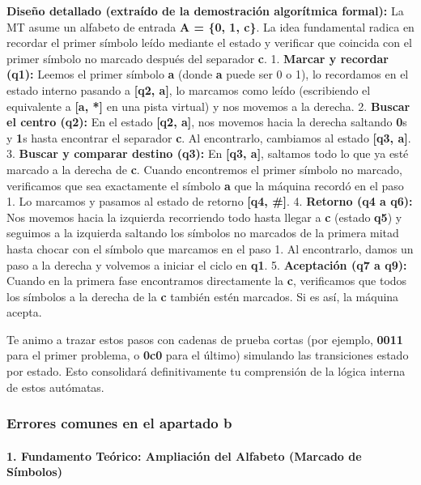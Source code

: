 \documentclass[12pt]{book} %
\begin{document}
\textbf{Diseño detallado (extraído de la demostración algorítmica
formal):} La MT asume un alfabeto de entrada \textbf{A = \{0, 1, c\}}.
La idea fundamental radica en recordar el primer símbolo leído mediante
el estado y verificar que coincida con el primer símbolo no marcado
después del separador \textbf{c}. 1. \textbf{Marcar y recordar (q1):}
Leemos el primer símbolo \textbf{a} (donde \textbf{a} puede ser 0 o 1),
lo recordamos en el estado interno pasando a \textbf{{[}q2, a{]}}, lo
marcamos como leído (escribiendo el equivalente a \textbf{{[}a, *{]}} en
una pista virtual) y nos movemos a la derecha. 2. \textbf{Buscar el
centro (q2):} En el estado \textbf{{[}q2, a{]}}, nos movemos hacia la
derecha saltando \textbf{0}s y \textbf{1}s hasta encontrar el separador
\textbf{c}. Al encontrarlo, cambiamos al estado \textbf{{[}q3, a{]}}. 3.
\textbf{Buscar y comparar destino (q3):} En \textbf{{[}q3, a{]}},
saltamos todo lo que ya esté marcado a la derecha de \textbf{c}. Cuando
encontremos el primer símbolo no marcado, verificamos que sea
exactamente el símbolo \textbf{a} que la máquina recordó en el paso 1.
Lo marcamos y pasamos al estado de retorno \textbf{{[}q4, \#{]}}. 4.
\textbf{Retorno (q4 a q6):} Nos movemos hacia la izquierda recorriendo
todo hasta llegar a \textbf{c} (estado \textbf{q5}) y seguimos a la
izquierda saltando los símbolos no marcados de la primera mitad hasta
chocar con el símbolo que marcamos en el paso 1. Al encontrarlo, damos
un paso a la derecha y volvemos a iniciar el ciclo en \textbf{q1}. 5.
\textbf{Aceptación (q7 a q9):} Cuando en la primera fase encontramos
directamente la \textbf{c}, verificamos que todos los símbolos a la
derecha de la \textbf{c} también estén marcados. Si es así, la máquina
acepta.

Te animo a trazar estos pasos con cadenas de prueba cortas (por ejemplo,
\textbf{0011} para el primer problema, o \textbf{0c0} para el último)
simulando las transiciones estado por estado. Esto consolidará
definitivamente tu comprensión de la lógica interna de estos autómatas.

\hypertarget{errores-comunes-en-el-apartado-b}{%
\subsubsection{Errores comunes en el apartado
b}\label{errores-comunes-en-el-apartado-b}}

\hypertarget{fundamento-teuxf3rico-ampliaciuxf3n-del-alfabeto-marcado-de-suxedmbolos}{%
\paragraph{1. Fundamento Teórico: Ampliación del Alfabeto (Marcado de
Símbolos)}\label{fundamento-teuxf3rico-ampliaciuxf3n-del-alfabeto-marcado-de-suxedmbolos}}
\end{document}
